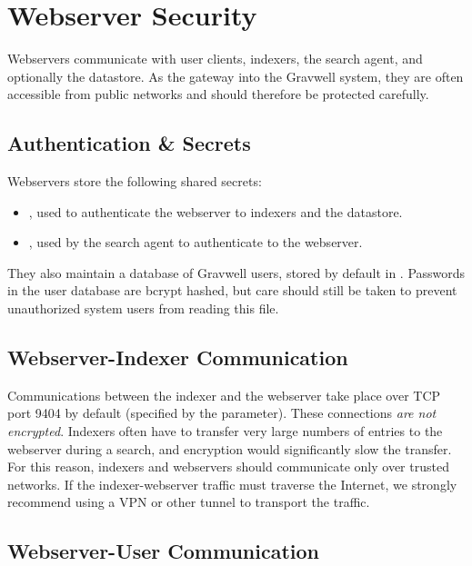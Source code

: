 \section{Webserver Security}
Webservers communicate with user clients, indexers, the search agent,
and optionally the datastore. As the gateway into the Gravwell system,
they are often accessible from public networks and should therefore be
protected carefully.

\subsection{Authentication \& Secrets}

Webservers store the following shared secrets:

\begin{itemize}
\tightlist
\item
  , used to authenticate the webserver to indexers and
  the datastore.
\item
  , used by the search agent to authenticate to the
  webserver.
\end{itemize}

They also maintain a database of Gravwell users, stored by default in
. Passwords in the user database are
bcrypt hashed, but care should still be taken to prevent unauthorized
system users from reading this file.

\subsection{Webserver-Indexer Communication}

Communications between the indexer and the webserver take place over
TCP port 9404 by default (specified by the  parameter).
These connections \emph{are not encrypted}. Indexers often have to transfer
very large numbers of entries to the webserver during a search, and
encryption would significantly slow the transfer. For this reason,
indexers and webservers should communicate only over trusted networks.
If the indexer-webserver traffic must traverse the Internet, we
strongly recommend using a VPN or other tunnel to transport the
traffic.

\subsection{Webserver-User Communication}

